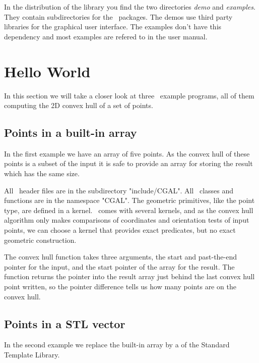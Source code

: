 In the distribution of the library  you find the two directories {\em demo}
and {\em examples}. They contain subdirectories for the \cgal\ packages.  
The demos use third party libraries for the graphical user interface. The 
examples don't have this dependency and most examples are refered to in the 
user manual.



\section{Hello World}

In this section we will take a closer look at three \cgal\ example
programs, all of them computing the 2D convex hull of a set of points.


\subsection{Points in a built-in array}

In the first example we have an array of five points.
As the convex hull of these points is a subset of the input
it is safe to provide an array for storing the result which
has the same size.



All \cgal\ header files are in the subdirectory "include/CGAL".  All \cgal\ 
classes and functions are in the namespace "CGAL".  The geometric
primitives, like the point type, are defined in a kernel. \cgal\ comes
with several kernels, and as the convex hull algorithm only makes
comparisons of coordinates and orientation tests of input points,
we can choose a kernel that provides exact predicates, but no 
exact geometric construction.

The convex hull function takes three arguments, the start
and past-the-end pointer for the input, and the start pointer of the 
array for the result. The function returns the pointer
into the result array just behind the last convex hull
point written, so the pointer difference tells us how
many points are on the convex hull. 
 

\subsection{Points in a STL vector}

In the second example we replace the built-in array
by a  of the Standard Template Library.

